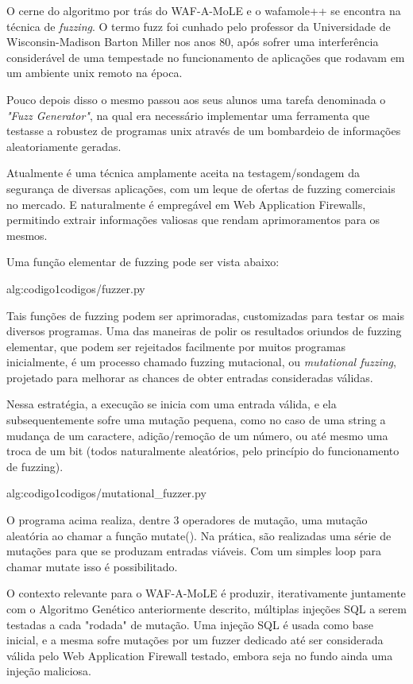 O cerne do algoritmo por trás do WAF-A-MoLE e o wafamole++ se encontra na técnica de \textit{fuzzing}. O termo fuzz foi cunhado pelo professor da Universidade de Wisconsin-Madison Barton Miller nos anos 80, após sofrer uma interferência considerável de uma tempestade no funcionamento de aplicações que rodavam em um ambiente unix remoto na época. 

Pouco depois disso o mesmo passou aos seus alunos uma tarefa denominada o \textit{"Fuzz Generator"}, na qual era necessário implementar uma ferramenta que testasse a robustez de programas unix através de um bombardeio de informações aleatoriamente geradas.

Atualmente é uma técnica amplamente aceita na testagem/sondagem da segurança de diversas aplicações, com um leque de ofertas de fuzzing comerciais no mercado. E naturalmente é empregável em Web Application Firewalls, permitindo extrair informações valiosas que rendam aprimoramentos para os mesmos.

Uma função elementar de fuzzing pode ser vista abaixo:

 {alg:codigo1}{codigos/fuzzer.py}

\bigskip
Tais funções de fuzzing podem ser aprimoradas, customizadas para testar os mais diversos programas. Uma das maneiras de polir os resultados oriundos de fuzzing elementar, que podem ser rejeitados facilmente por muitos programas inicialmente, é um processo chamado fuzzing mutacional, ou \textit{mutational fuzzing}, projetado para melhorar as chances de obter entradas consideradas válidas.

Nessa estratégia, a execução se inicia com uma entrada válida, e ela subsequentemente sofre uma mutação pequena, como no caso de uma string a mudança de um caractere, adição/remoção de um número, ou até mesmo uma troca de um bit (todos naturalmente aleatórios, pelo princípio do funcionamento de fuzzing).

 {alg:codigo1}{codigos/mutational_fuzzer.py}

\bigskip
O programa acima realiza, dentre 3 operadores de mutação, uma mutação aleatória ao chamar a função mutate(). Na prática, são realizadas uma série de mutações para que se produzam entradas viáveis. Com um simples loop para chamar mutate isso é possibilitado.

O contexto relevante para o WAF-A-MoLE é produzir, iterativamente juntamente com o Algoritmo Genético anteriormente descrito, múltiplas injeções SQL a serem testadas a cada "rodada" de mutação. Uma injeção SQL é usada como base inicial, e a mesma sofre mutações por um fuzzer dedicado até ser considerada válida pelo Web Application Firewall testado, embora seja no fundo ainda uma injeção maliciosa.


